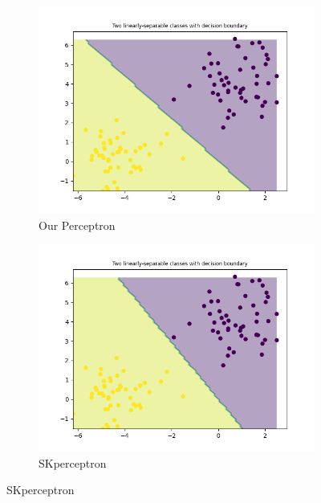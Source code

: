     \begin{figure}[ht]
        \centering
        \begin{subfigure}{0.4\textwidth}
            \centering
            \includegraphics[width=\linewidth]{code/plots/our_perceptron_LR0.1_ITER5_dataset_loaddata}
            \caption{Our Perceptron}
            \label{fig:image1}
        \end{subfigure}
        \hspace{2cm} %
        \begin{subfigure}{0.4\textwidth}
            \centering
            \includegraphics[width=\linewidth]{code/plots/SKperceptron_LR0.1_ITER5_dataset_loaddata}
            \caption{SKperceptron}
            \label{fig:image2}
        \end{subfigure}
        \label{fig:overall}
    \end{figure}

